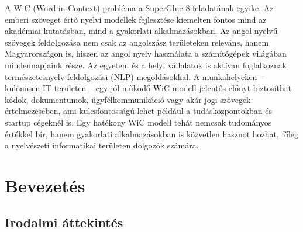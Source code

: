 \documentclass[12pt]{report}
\theoremstyle{definition}
\begin{document}
A WiC (Word-in-Context) probléma a SuperGlue 8 feladatának egyike. Az emberi szöveget értő nyelvi modellek fejlesztése kiemelten fontos mind az akadémiai kutatásban, mind a gyakorlati alkalmazásokban. Az angol nyelvű szövegek feldolgozása nem csak az angolszász területeken releváns, hanem Magyarországon is, hiszen az angol nyelv használata a számítógépek világában mindennapjaink része. Az egyetem és a helyi vállalatok is aktívan foglalkoznak természetesnyelv-feldolgozási (NLP) megoldásokkal. A munkahelyeken – különösen IT területen – egy jól működő WiC modell jelentős előnyt biztosíthat kódok, dokumentumok, ügyfélkommunikáció vagy akár jogi szövegek értelmezésében, ami kulcsfontosságú lehet például a tudásközpontokban és startup cégeknél is. Egy hatékony WiC modell tehát nemcsak tudományos értékkel bír, hanem gyakorlati alkalmazásokban is közvetlen hasznot hozhat, főleg a nyelvészeti informatikai területen dolgozók számára.
\clearpage

\chapter*{Bevezetés}

\section*{Irodalmi áttekintés}

\end{document}
